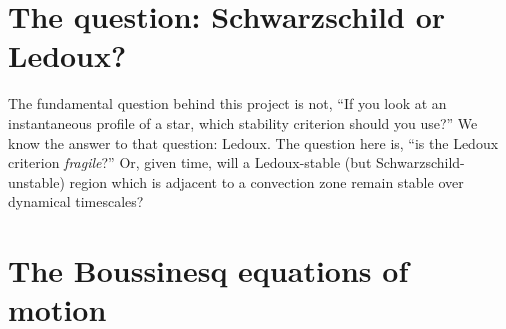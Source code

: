 \documentclass[onecolumn, amsmath, amsfonts, amssymb]{aastex62}
\begin{document}
\section{The question: Schwarzschild or Ledoux?}
The fundamental question behind this project is not, ``If you look at an instantaneous profile of a star, which stability criterion should you use?''
We know the answer to that question: Ledoux.
The question here is, ``is the Ledoux criterion \emph{fragile}?''
Or, given time, will a Ledoux-stable (but Schwarzschild-unstable) region which is adjacent to a convection zone remain stable over dynamical timescales?

\section{The Boussinesq equations of motion}
\end{document}
